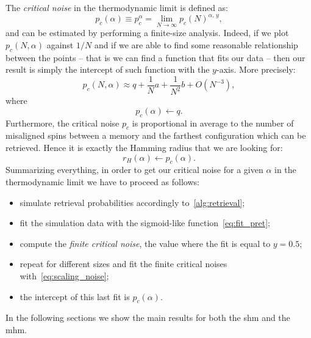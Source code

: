 \documentclass[\rootdir/main.tex]{subfiles}
\begin{document}
The \emph{critical noise} in the thermodynamic limit is defined as:
\begin{equation}\label{eq:critical_noise}
   p_c\left(\alpha\right) \equiv p_c^{\alpha} = \lim_{N \to \infty} p_c(N)^{\alpha,\, y},
\end{equation}
and can be estimated by performing a finite-size analysis. Indeed, if we plot $p_c \left(N, \alpha\right)$ against $1/N$ and if we are able to find some reasonable relationship between the points -- that is we can find a function that fits our data -- then our result is simply the intercept of such function with the $y$-axis. More precisely:
\begin{equation}\label{eq:scaling_noise}
    p_c(N, \alpha) \approx q + \frac{1}{N}a + \frac{1}{N^2} b + O\left(N^{-3}\right),
\end{equation}
where
\begin{equation*}
    p_c(\alpha) \gets q.
\end{equation*}
Furthermore, the critical noise $p_c$ is proportional in average to the number of misaligned spins between a memory and the farthest configuration which can be retrieved. Hence it is exactly the Hamming radius that we are looking for:
\begin{equation}
    r_H \left( \alpha \right) \gets  p_c\left(\alpha\right).
\end{equation}
Summarizing everything, in order to get our critical noise for a given $\alpha$ in the thermodynamic limit we have to proceed as follows:
\begin{itemize}
    \item simulate retrieval probabilities accordingly to~\cref{alg:retrieval};
    \item fit the simulation data with the sigmoid-like function~\cref{eq:fit_pret};
    \item compute the \emph{finite critical noise}, \ie the value where the fit is equal to $y = 0.5$;
    \item repeat for different sizes and fit the finite critical noises with~\cref{eq:scaling_noise};
    \item the intercept of this last fit is $p_c(\alpha)$.
\end{itemize}

In the following sections we show the main results for both the \acrlong{shm} and the \acrlong{mhm}.
\end{document}
